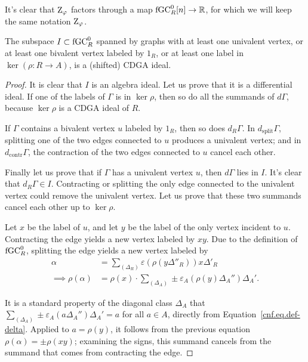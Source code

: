 It's clear that $\mathrm{Z}_{\varphi}$ factors through a map $\mathrm{fGC}^{0}_{R}[n] \to \mathbb{R}$, for which we will keep the same notation $\mathrm{Z}_{\varphi}$.

\begin{lemma}
  \label{cnf.lem.fgczero}
  The subspace $I \subset \mathrm{fGC}^{0}_{R}$ spanned by graphs with at least one univalent vertex, or at least one bivalent vertex labeled by $1_{R}$, or at least one label in $\ker(\rho : R \to A)$, is a (shifted) CDGA ideal.
\end{lemma}

\begin{proof}
  It is clear that $I$ is an algebra ideal.
  Let us prove that it is a differential ideal.
  If one of the labels of $\Gamma$ is in $\ker \rho$, then so do all the summands of $d \Gamma$, because $\ker \rho$ is a CDGA ideal of $R$.

  If $\Gamma$ contains a bivalent vertex $u$ labeled by $1_{R}$, then so does $d_{R} \Gamma$. In $d_{\mathrm{split}} \Gamma$, splitting one of the two edges connected to $u$ produces a univalent vertex; and in $d_{\mathrm{contr}} \Gamma$, the contraction of the two edges connected to $u$ cancel each other.

  Finally let us prove that if $\Gamma$ has a univalent vertex $u$, then $d\Gamma$ lies in $I$. It's clear that $d_{R} \Gamma \in I$.
  Contracting or splitting the only edge connected to the univalent vertex could remove the univalent vertex.
  Let us prove that these two summands cancel each other up to $\ker \rho$.


  Let $x$ be the label of $u$, and let $y$ be the label of the only vertex incident to $u$.
  Contracting the edge yields a new vertex labeled by $xy$.
  Due to the definition of $\mathrm{fGC}^{0}_{R}$, splitting the edge yields a new vertex labeled by
  \begin{align*}
    \alpha
    & = \sum_{(\Delta_{R})} \varepsilon(\rho(y \Delta''_{R})) x \Delta'_{R} \\
    \implies \rho(\alpha)
    & = \rho(x) \cdot \sum_{(\Delta_{A})} \pm \varepsilon_{A}(\rho(y) \Delta_{A}'') \Delta_{A}'.
  \end{align*}

  It is a standard property of the diagonal class $\Delta_{A}$ that $\sum_{(\Delta_{A})} \pm \varepsilon_{A}(a \Delta_{A}'') \Delta_{A}' = a$ for all $a \in A$, directly from Equation~\eqref{cnf.eq.def-delta}.
  Applied to $a = \rho(y)$, it follows from the previous equation $\rho(\alpha) = \pm \rho(xy)$; examining the signs, this summand cancels from the summand that comes from contracting the edge.
\end{proof}


